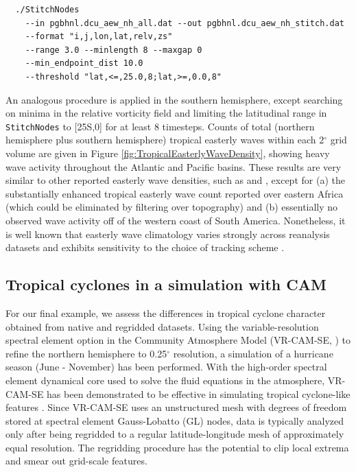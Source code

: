 \documentclass[gmdd, hvmath, online]{copernicus_discussions}
\begin{document}
{\small \begin{verbatim}
  ./StitchNodes
    --in pgbhnl.dcu_aew_nh_all.dat --out pgbhnl.dcu_aew_nh_stitch.dat
    --format "i,j,lon,lat,relv,zs"
    --range 3.0 --minlength 8 --maxgap 0
    --min_endpoint_dist 10.0
    --threshold "lat,<=,25.0,8;lat,>=,0.0,8"
\end{verbatim}}

An analogous procedure is applied in the southern hemisphere, except searching on minima in the relative vorticity field and limiting the latitudinal range in \texttt{StitchNodes} to [25S,0] for at least 8 timesteps.  Counts of total (northern hemisphere plus southern hemisphere) tropical easterly waves within each 2$^\circ$ grid volume are given in Figure \ref{fig:TropicalEasterlyWaveDensity}, showing heavy wave activity throughout the Atlantic and Pacific basins.  These results are very similar to other reported easterly wave densities, such as \cite{belanger2014african} and \cite{thorncroft2001african}, except for (a) the substantially enhanced tropical easterly wave count reported over eastern Africa (which could be eliminated by filtering over topography) and (b) essentially no observed wave activity off of the western coast of South America.  Nonetheless, it is well known that easterly wave climatology varies strongly across reanalysis datasets and exhibits sensitivity to the choice of tracking scheme \citep{hodges2003comparison}.


\subsection{Tropical cyclones in a simulation with CAM} \label{sec:TropicalCycloneCAM}

For our final example, we assess the differences in tropical cyclone character obtained from native and regridded datasets. Using the variable-resolution spectral element option in the Community Atmosphere Model (VR-CAM-SE, \citet{Zarzycki2014APE}) to refine the northern hemisphere to 0.25$^\circ$ resolution, a simulation of a hurricane season (June - November) has been performed. With the high-order spectral element dynamical core used to solve the fluid equations in the atmosphere, VR-CAM-SE has been demonstrated to be effective in simulating tropical cyclone-like features \citep{zarzycki2014multidecadal, zarzycki2014using}. Since VR-CAM-SE uses an unstructured mesh with degrees of freedom stored at spectral element Gauss-Lobatto (GL) nodes, data is typically analyzed only after being regridded to a regular latitude-longitude mesh of approximately equal resolution.  The regridding procedure has the potential to clip local extrema and smear out grid-scale features.
\end{document}
